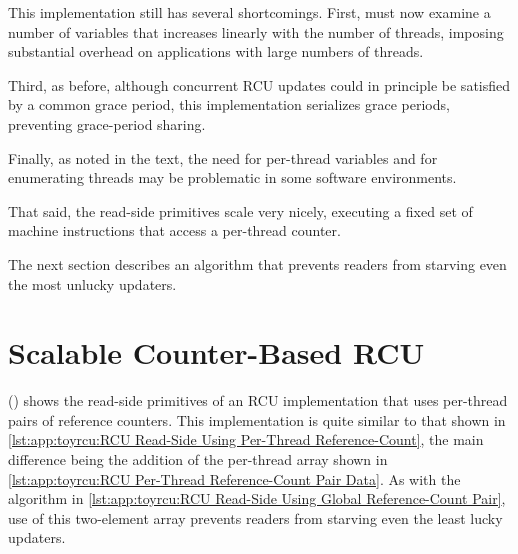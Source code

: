 \QuickQuizEnd

This implementation still has several shortcomings.
First,  must now examine a number of variables
that increases linearly with the number of threads, imposing substantial
overhead on applications with large numbers of threads.

Third, as before, although concurrent RCU updates could in principle
be satisfied by a common grace period, this implementation serializes
grace periods, preventing grace-period sharing.

Finally, as noted in the text, the need for per-thread variables
and for enumerating threads may be problematic in some software
environments.

That said, the read-side primitives scale very nicely, executing a
fixed set of machine instructions that access a per-thread counter.

The next section describes an algorithm that prevents readers from
starving even the most unlucky updaters.

\section{Scalable Counter-Based RCU}
\label{sec:app:toyrcu:Scalable Counter-Based RCU}

()
shows the read-side primitives of an RCU implementation that uses per-thread
pairs of reference counters.
This implementation is quite similar to that shown in
\cref{lst:app:toyrcu:RCU Read-Side Using Per-Thread Reference-Count},
the main difference being the addition of the  per-thread
array shown in
\cref{lst:app:toyrcu:RCU Per-Thread Reference-Count Pair Data}.
As with the algorithm in 
\cref{lst:app:toyrcu:RCU Read-Side Using Global Reference-Count Pair},
use of this two-element array prevents readers from starving even the
least lucky updaters.

